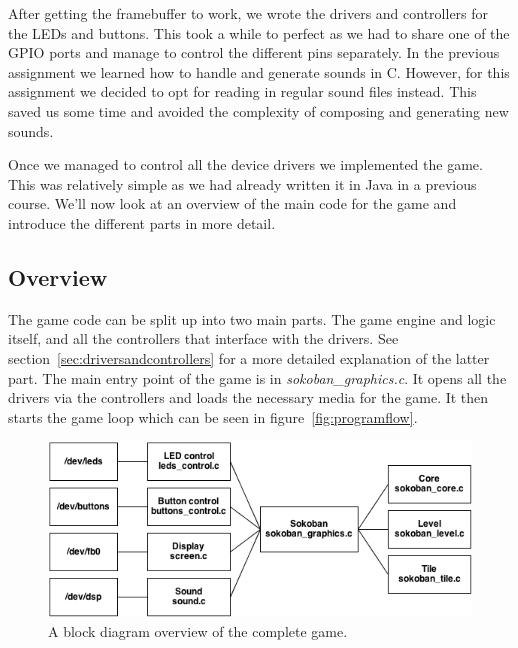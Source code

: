 \documentclass[a4paper,11pt]{article}
\begin{document}
After getting the framebuffer to work, we wrote the drivers and controllers for the LEDs and buttons. This took a while to perfect as we had to share one of the GPIO ports and manage to control the different pins separately. In the previous assignment we learned how to handle and generate sounds in C. However, for this assignment we decided to opt for reading in regular sound files instead. This saved us some time and avoided the complexity of composing and generating new sounds.

Once we managed to control all the device drivers we implemented the game. This was relatively simple as we had already written it in Java in a previous course. We'll now look at an overview of the main code for the game and introduce the different parts in more detail.

\subsection{Overview}
The game code can be split up into two main parts. The game engine and logic itself, and all the controllers that interface with the drivers. See section~\ref{sec:driversandcontrollers} for a more detailed explanation of the latter part. The main entry point of the game is in \textit{sokoban\_graphics.c}. It opens all the drivers via the controllers and loads the necessary media for the game. It then starts the game loop which can be seen in figure~\ref{fig:programflow}. 

\begin{figure}[H]
\centering
\includegraphics[scale=0.6]{images/blockdiagram.png}
\caption{A block diagram overview of the complete game.}
\label{fig:blockdiagram}
\end{figure}
\end{document}
